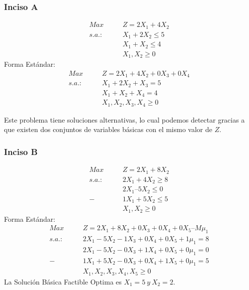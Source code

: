 \documentclass{tarea}
\begin{document}
\begin{homeworkProblem}
\subsubsection{Inciso A}
\begin{align*}
	Max\ &Z = 2X_1 + 4X_2 \\
    s.a.:\quad\quad &X_1 + 2X_2 \le 5 \\
	&X_1 + X_2 \le 4 \\
	&X_1,X_2 \ge 0
\end{align*}
Forma Estándar:
\begin{align*}
	Max\ &Z = 2X_1 + 4X_2 + 0X_3 + 0X_4\\
    s.a.:\quad\quad &X_1 + 2X_2 + X_3 = 5 \\
	&X_1 + X_2 + X_4 =  4 \\
	&X_1,X_2,X_3,X_4 \ge 0
\end{align*}

Este problema tiene soluciones alternativas, lo cual podemos detectar gracias a que existen dos conjuntos de variables básicas con el mismo valor de $Z$.



\subsubsection{Inciso B}
\begin{align*}
Max\ &Z = 2X_1 + 8X_2 \\
s.a. : \quad \quad &2X_1 + 4X_2 \ge 8 \\
&2X_1 – 5X_2 \le 0 \\
-&1X_1 + 5X_2 \le 5 \\
&X_1,X_2 \ge 0
\end{align*}
Forma Estándar:
\begin{align*}
Max\ &Z = 2X_1 + 8X_2 +0X_3 + 0X_4 + 0X_5  –  M\mu_1 \\
s.a. : \quad \quad &2X_1 - 5X_2 -1X_3 +0X_4 + 0X_5 + 1\mu_1= 8 \\
&2X_1 - 5X_2 -0X_3 +1X_4 +0X_5 + 0\mu_1 =0\\
-&1X_1 + 5X_2 -0X_3 +0X_4 + 1X_5 + 0\mu_1 = 5 \\
&X_1,X_2,X_3,X_4,X_5 \ge 0
\end{align*}
La Solución Básica Factible Optima es $X_1 = 5\ y\ X_2=2$.



\end{homeworkProblem}
\end{document}
